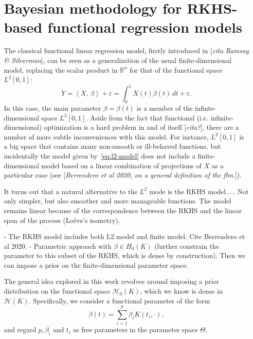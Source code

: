 \documentclass[ba]{imsart}
\numberwithin{equation}{section}
\theoremstyle{plain}
\renewcommand{\epsilon}{\varepsilon}
\newcommand{\R}{\mathbb{R}}
\newcommand\dotprod[2]{\left\langle #1,\, #2 \right\rangle}
\newenvironment{comment}
{
\noindent \em \color{red}
}
{
\color{black}
}
\newcommand\incomment[1]{\color{red}[\textit{#1}]\color{black}}
\begin{document}
\section{Bayesian methodology for RKHS-based functional regression models}

The classical functional linear regression model, firstly introduced in \incomment{cita Ramsay \& Silverman}, can be seen as a generalization of the usual finite-dimensional model, replacing the scalar product in \(\R^n\) for that of the functional space \(L^2[0,1]\):
\begin{equation}\label{eq:l2-model}
Y = \dotprod{X}{\beta} + \epsilon = \int_0^1 X(t)\beta(t)\, dt + \epsilon.
\end{equation}
In this case, the main parameter \(\beta=\beta(t)\) is a member of the infinte-dimensional space \(L^2[0, 1]\). Aside from the fact that functional (i.e. infinite-dimensional) optimization is a hard problem in and of itself \incomment{cita?}, there are a number of more subtle inconveniences with this model. For instance, \(L^2[0, 1]\) is a big space that contains many non-smooth or ill-behaved functions, but incidentally the model given by~\eqref{eq:l2-model} does not include a finite-dimensional model based on a linear combination of projections of \(X\) as a particular case (see \incomment{Berrendero et al 2020, on a general definition of the flm.}).

It turns out that a natural alternative to the \(L^2\) mode is the RKHS model..... Not only simpler, but also smoother and more manageable functions. The model remains linear because of the correspondence between the RKHS and the linear span of the process (Loève’s isometry).

\begin{comment}
  - The RKHS model includes both L2 model and finite model. Cite Berrendero et al 2020.
  - Parametric approach with \(\beta \in H_0(K)\) (further constrain the parameter to this subset of the RKHS, which is dense by construction). Then we can impose a prior on the finite-dimensional parameter space.
\end{comment}


The general idea explored in this work revolves around imposing a prior distribution on the functional space \(\mathcal H_0(K)\), which we know is dense in \(\mathcal H(K)\). Specifically, we consider a functional parameter of the form
\begin{equation}\label{eq:parameter-rkhs}
  \beta(t) = \sum_{i=1}^p \beta_i K(t_i, \cdot),
\end{equation}
and regard \(p, \beta_i\) and \(t_i\) as free parameters in the parameter space \(\Theta\).
\end{document}
